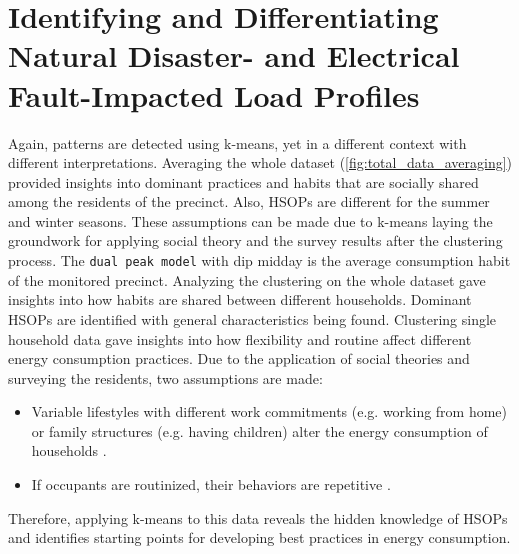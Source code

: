 \section{Identifying and Differentiating Natural Disaster- and Electrical Fault-Impacted Load Profiles}
\label{sec:identifying_and_differentiating_natural_disaster_and_electrical_fault_impacted_load_profiles}
Again, patterns are detected using k-means, yet in a different context with different interpretations.
Averaging the whole dataset (\autoref{fig:total_data_averaging}) provided insights into dominant practices and habits that are socially shared among the residents of the precinct.
Also, HSOPs are different for the summer and winter seasons.
These assumptions can be made due to k-means laying the groundwork for applying social theory and the survey results after the clustering process.
The \texttt{dual peak model} with dip midday is the average consumption habit of the monitored precinct.
Analyzing the clustering on the whole dataset gave insights into how habits are shared between different households.
Dominant HSOPs are identified with general characteristics being found.
Clustering single household data gave insights into how flexibility and routine affect different energy consumption practices.
Due to the application of social theories and surveying the residents, two assumptions are made:
\begin{itemize}
    \item Variable lifestyles with different work commitments (e.g. working from home) or family structures (e.g. having children) alter the energy consumption of households \cite{KUR-HBP}.
    \item If occupants are routinized, their behaviors are repetitive \cite{BRE-EWP}.
\end{itemize}
Therefore, applying k-means to this data reveals the hidden knowledge of HSOPs and identifies starting points for developing best practices in energy consumption.